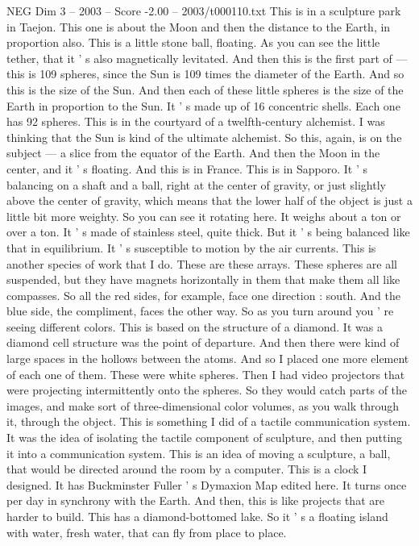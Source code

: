 \begin{textsample}{NEG Dim 3 – 2003 – Score -2.00 – 2003/t000110.txt}
This is in a sculpture park in Taejon.
This one is about the Moon and then the distance to the Earth, in proportion also.
This is a little stone ball, floating.
As you can see the little tether, that it ' s also magnetically levitated.
And then this is the first part of — this is 109 spheres, since the Sun is 109 times the diameter of the Earth.
And so this is the size of the Sun.
And then each of these little spheres is the size of the Earth in proportion to the Sun.
It ' s made up of 16 concentric shells.
Each one has 92 spheres.
This is in the courtyard of a twelfth-century alchemist.
I was thinking that the Sun is kind of the ultimate alchemist.
So this, again, is on the subject — a slice from the equator of the Earth.
And then the Moon in the center, and it ' s floating.
And this is in France.
This is in Sapporo.
It ' s balancing on a shaft and a ball, right at the center of gravity, or just slightly above the center of gravity, which means that the lower half of the object is just a little bit more weighty.
So you can see it rotating here.
It weighs about a ton or over a ton.
It ' s made of stainless steel, quite thick.
But it ' s being balanced like that in equilibrium.
It ' s susceptible to motion by the air currents.
This is another species of work that I do.
These are these arrays.
These spheres are all suspended, but they have magnets horizontally in them that make them all like compasses.
So all the red sides, for example, face one direction : south.
And the blue side, the compliment, faces the other way.
So as you turn around you ' re seeing different colors.
This is based on the structure of a diamond.
It was a diamond cell structure was the point of departure.
And then there were kind of large spaces in the hollows between the atoms.
And so I placed one more element of each one of them.
These were white spheres.
Then I had video projectors that were projecting intermittently onto the spheres.
So they would catch parts of the images, and make sort of three-dimensional color volumes, as you walk through it, through the object.
This is something I did of a tactile communication system.
It was the idea of isolating the tactile component of sculpture, and then putting it into a communication system.
This is an idea of moving a sculpture, a ball, that would be directed around the room by a computer.
This is a clock I designed.
It has Buckminster Fuller ' s Dymaxion Map edited here.
It turns once per day in synchrony with the Earth.
And then, this is like projects that are harder to build.
This has a diamond-bottomed lake.
So it ' s a floating island with water, fresh water, that can fly from place to place.

\end{textsample}
